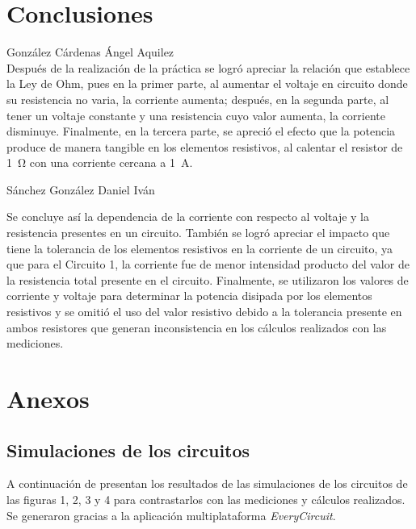 \documentclass[a4paper,12pt]{article}
\begin{document}
\newpage

\section{Conclusiones}

\vspace{.5cm}

{\Large González Cárdenas Ángel Aquilez}\\
\vspace{.3cm}
Después de la realización de la práctica se logró apreciar la relación que establece la Ley de Ohm, pues en la primer parte, al aumentar el voltaje en circuito donde su resistencia no varia, la corriente aumenta; después, en la segunda parte, al tener un voltaje constante y una resistencia cuyo valor aumenta, la corriente disminuye. Finalmente, en la tercera parte, se apreció el efecto que la potencia produce de manera tangible en los elementos resistivos, al calentar el resistor de \SI{1}{\ohm} con una corriente cercana a \SI{1}{\A}.\par

\vspace{1cm}

{\Large Sánchez González Daniel Iván}\\
\vspace{.3cm}

Se concluye así la dependencia de la corriente con respecto al voltaje y la resistencia presentes en un circuito. También se logró apreciar el impacto que tiene la tolerancia de los elementos resistivos en la corriente de un circuito, ya que para el Circuito 1, la corriente fue de menor intensidad producto del valor de la resistencia total presente en el circuito. Finalmente, se utilizaron los valores de corriente y voltaje para determinar la potencia disipada por los elementos resistivos y se omitió el uso del valor resistivo debido a la tolerancia presente en ambos resistores que generan inconsistencia en los cálculos realizados con las mediciones.\par

\section{Anexos}
\subsection{Simulaciones de los circuitos}

A continuación de presentan los resultados de las simulaciones de los circuitos de las figuras 1, 2, 3 y 4 para contrastarlos con las mediciones y cálculos realizados. Se generaron gracias a la aplicación multiplataforma \textit{EveryCircuit}\texttrademark. \\
\end{document}
